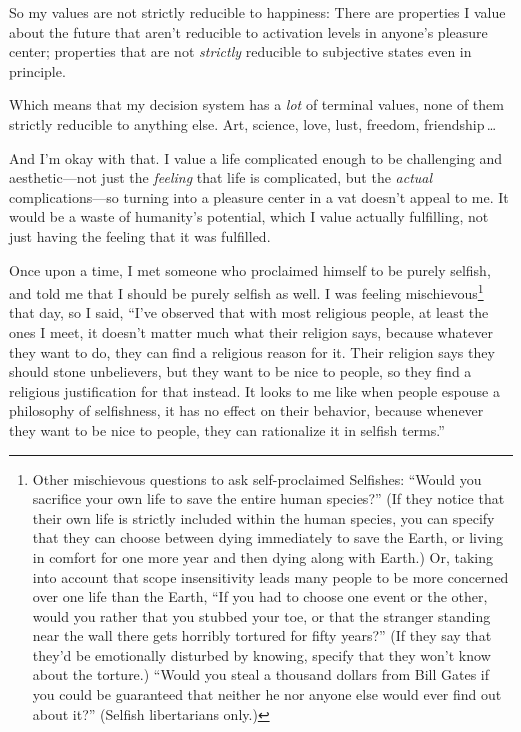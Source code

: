  So my values are not strictly reducible to happiness: There are
properties I value about the future that aren't
reducible to activation levels in anyone's pleasure
center; properties that are not \textit{strictly} reducible to
subjective states even in principle.


 Which means that my decision system has a \textit{lot} of terminal
values, none of them strictly reducible to anything else. Art, science,
love, lust, freedom, friendship\,\ldots


 And I'm okay with that. I value a life complicated
enough to be challenging and aesthetic---not just the \textit{feeling}
that life is complicated, but the \textit{actual} complications---so
turning into a pleasure center in a vat doesn't appeal
to me. It would be a waste of humanity's potential,
which I value actually fulfilling, not just having the feeling that it
was fulfilled.

\myendsectiontext


\bigskip



 Once upon a time, I met someone who proclaimed himself to be
purely selfish, and told me that I should be purely selfish as well. I
was feeling mischievous\footnote{Other mischievous questions to ask self-proclaimed Selfishes:
``Would you sacrifice your own life to save the entire
human species?'' (If they notice that their own life
is strictly included within the human species, you can specify that
they can choose between dying immediately to save the Earth, or living
in comfort for one more year and then dying along with Earth.) Or,
taking into account that scope insensitivity leads many people to be
more concerned over one life than the Earth, ``If you
had to choose one event or the other, would you rather that you stubbed
your toe, or that the stranger standing near the wall there gets
horribly tortured for fifty years?'' (If they say
that they'd be emotionally disturbed by knowing,
specify that they won't know about the torture.)
``Would you steal a thousand dollars from Bill Gates
if you could be guaranteed that neither he nor anyone else would ever
find out about it?'' (Selfish libertarians only.)} that day, so I said,
``I've observed that with most
religious people, at least the ones I meet, it doesn't
matter much what their religion says, because whatever they want to do,
they can find a religious reason for it. Their religion says they
should stone unbelievers, but they want to be nice to people, so they
find a religious justification for that instead. It looks to me like
when people espouse a philosophy of selfishness, it has no effect on
their behavior, because whenever they want to be nice to people, they
can rationalize it in selfish terms.'' 



